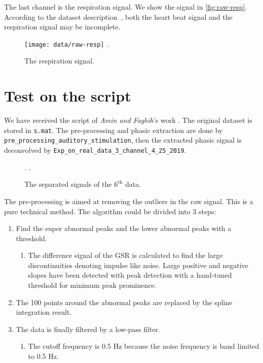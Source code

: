 \documentclass[]{article}
\begin{document}
The last channel is the respiration signal. We show the signal in \autoref{fig:raw-resp}. According to the dataset description~\cite{bach2014pspm}, both the heart beat signal and the respiration signal may be incomplete.

\begin{figure}[htbp]
  \centering
  \texttt{[image: data/raw-resp]}
  \DeclareGraphicsExtensions.
  \caption{The respiration signal.} \label{fig:raw-resp}
\end{figure}

\section{Test on the script}

We have received the script of \textit{Amin and Faghih}'s work \cite{amin2019robust}. The original dataset is stored in \texttt{s.mat}. The pre-processing and phasic extraction are done by \texttt{pre\_processing\_auditory\_stimulation}, then the extracted phasic signal is deconvolved by \texttt{Exp\_on\_real\_data\_3\_channel\_4\_25\_2019}.

\begin{figure}[htbp]
  \centering
  \DeclareGraphicsExtensions.
  \DeclareGraphicsExtensions.
  \caption{The separated signals of the $6^{\mathrm{th}}$ data.} \label{fig:sep-signal}
\end{figure}

The pre-processing is aimed at removing the outliers in the raw signal. This is a pure technical method. The algorithm could be divided into 3 steps:

\begin{enumerate}
  \item Find the super abnormal peaks and the lower abnormal peaks with a threshold.
  \begin{enumerate}
      \item The difference signal of the GSR is calculated to find the large discontinuities denoting impulse like noise. Large positive and negative slopes have been detected with peak detection with a hand-tuned threshold for minimum peak prominence.
  \end{enumerate}
  \item The 100 points around the abnormal peaks are replaced by the spline integration result.
  \item The data is finally filtered by a low-pass filter.
  \begin{enumerate}
      \item The cutoff frequency is 0.5 Hz because the noise frequency is band limited to 0.5 Hz.
  \end{enumerate}
\end{enumerate}
\end{document}
